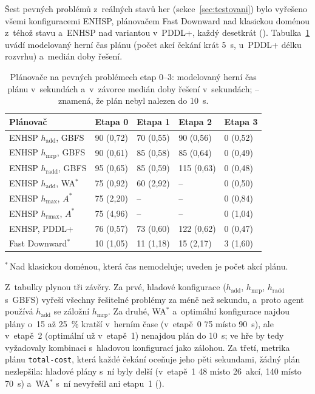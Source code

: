 Šest pevných problémů z~reálných stavů her (sekce~\ref{sec:testovani}) bylo vyřešeno všemi konfiguracemi ENHSP, plánovačem Fast Downward nad klasickou doménou z~téhož stavu a~ENHSP nad variantou v~PDDL+, každý desetkrát (). Tabulka~\ref{tab:konfigurace} uvádí modelovaný herní čas plánu (počet akcí čekání krát 5~s, u~PDDL+ délku rozvrhu) a~medián doby řešení.

\begin{table}[ht]
	\centering
	\caption[Plánovače na pevných problémech.]{Plánovače na pevných problémech etap 0--3: modelovaný herní čas plánu v~sekundách a~v~závorce medián doby řešení v~sekundách; -- znamená, že plán nebyl nalezen do 10~s.}
	\label{tab:konfigurace}
	\footnotesize
	\begin{tabular}{@{} l l l l l @{}}
		\toprule
		\textbf{Plánovač} & \textbf{Etapa 0} & \textbf{Etapa 1} & \textbf{Etapa 2} & \textbf{Etapa 3} \\
		\midrule
		ENHSP $h_{\mathrm{add}}$, GBFS & 90 (0,72) & 70 (0,55) & 90 (0,56) & 0 (0,52) \\
		ENHSP $h_{\mathrm{mrp}}$, GBFS & 90 (0,61) & 85 (0,58) & 85 (0,64) & 0 (0,49) \\
		ENHSP $h_{\mathrm{radd}}$, GBFS & 95 (0,65) & 85 (0,59) & 115 (0,63) & 0 (0,48) \\
		ENHSP $h_{\mathrm{add}}$, WA$^*$ & 75 (0,92) & 60 (2,92) & -- & 0 (0,50) \\
		ENHSP $h_{\max}$, $A^*$ & 75 (2,20) & -- & -- & 0 (0,84) \\
		ENHSP $h_{\mathrm{rmax}}$, $A^*$ & 75 (4,96) & -- & -- & 0 (1,04) \\
		ENHSP, PDDL+ & 76 (0,57) & 73 (0,60) & 122 (0,62) & 0 (0,47) \\
		\addlinespace
		Fast Downward$^{*}$ & 10 (1,05) & 11 (1,18) & 15 (2,17) & 3 (1,60) \\
		\bottomrule
	\end{tabular}
	\par\smallskip\footnotesize $^{*}$\,Nad klasickou doménou, která čas nemodeluje; uveden je počet akcí plánu.
\end{table}

Z~tabulky plynou tři závěry. Za prvé, hladové konfigurace ($h_{\mathrm{add}}$, $h_{\mathrm{mrp}}$, $h_{\mathrm{radd}}$ s~GBFS) vyřeší všechny řešitelné problémy za méně než sekundu, a~proto agent používá $h_{\mathrm{add}}$ se záložní $h_{\mathrm{mrp}}$. Za druhé, WA$^*$ a~optimální konfigurace najdou plány o~15 až 25~\% kratší v~herním čase (v~etapě~0 75 místo 90~s), ale v~etapě~2 (optimální už v~etapě~1) nenajdou plán do 10~s; ve hře by tedy vyžadovaly kombinaci s~hladovou konfigurací jako zálohou. Za třetí, metrika plánu \texttt{total-cost}, která každé čekání oceňuje jeho pěti sekundami, žádný plán nezlepšila: hladové plány s~ní byly delší (v~etapě~1 48 místo 26~akcí, 140 místo 70~s) a~WA$^*$ s~ní nevyřešil ani etapu~1 ().


